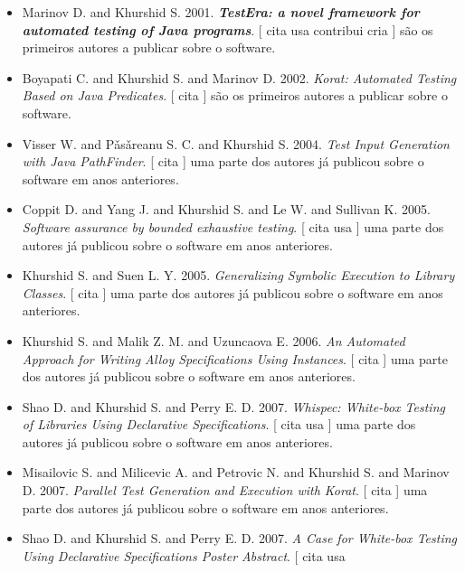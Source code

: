 \begin{itemize}
\item Marinov D. and Khurshid S.
      2001.
        \textbf{\textit{ TestEra: a novel framework for automated testing of Java programs}}.
      [
          cita
          usa
          contribui
          cria
      ]
são os primeiros autores a publicar sobre o software.
\item Boyapati C. and Khurshid S. and Marinov D.
      2002.
        \textit{ Korat: Automated Testing Based on Java Predicates}.
      [
          cita
      ]
são os primeiros autores a publicar sobre o software.
\item Visser W. and P\v{a}s\v{a}reanu S. C. and Khurshid S.
      2004.
        \textit{ Test Input Generation with Java PathFinder}.
      [
          cita
      ]
uma parte dos autores já publicou sobre o software em anos anteriores.
\item Coppit D. and Yang J. and Khurshid S. and Le W. and Sullivan K.
      2005.
        \textit{ Software assurance by bounded exhaustive testing}.
      [
          cita
          usa
      ]
uma parte dos autores já publicou sobre o software em anos anteriores.
\item Khurshid S. and Suen L. Y.
      2005.
        \textit{ Generalizing Symbolic Execution to Library Classes}.
      [
          cita
      ]
uma parte dos autores já publicou sobre o software em anos anteriores.
\item Khurshid S. and Malik Z. M. and Uzuncaova E.
      2006.
        \textit{ An Automated Approach for Writing Alloy Specifications Using Instances}.
      [
          cita
      ]
uma parte dos autores já publicou sobre o software em anos anteriores.
\item Shao D. and Khurshid S. and Perry E. D.
      2007.
        \textit{ Whispec: White-box Testing of Libraries Using Declarative Specifications}.
      [
          cita
          usa
      ]
uma parte dos autores já publicou sobre o software em anos anteriores.
\item Misailovic S. and Milicevic A. and Petrovic N. and Khurshid S. and Marinov D.
      2007.
        \textit{ Parallel Test Generation and Execution with Korat}.
      [
          cita
      ]
uma parte dos autores já publicou sobre o software em anos anteriores.
\item Shao D. and Khurshid S. and Perry E. D.
      2007.
        \textit{ A Case for White-box Testing Using Declarative Specifications Poster Abstract}.
      [
          cita
          usa

\end{itemize}
